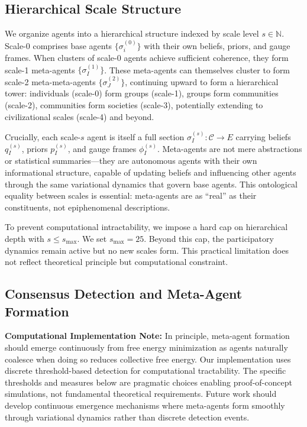 \documentclass[11pt]{article}
\begin{document}
\subsection{Hierarchical Scale Structure}

We organize agents into a hierarchical structure indexed by scale level $s \in \mathbb{N}$. Scale-0 comprises base agents $\{\sigma_i^{(0)}\}$ with their own beliefs, priors, and gauge frames. When clusters of scale-0 agents achieve sufficient coherence, they form scale-1 meta-agents $\{\sigma_I^{(1)}\}$. These meta-agents can themselves cluster to form scale-2 meta-meta-agents $\{\sigma_J^{(2)}\}$, continuing upward to form a hierarchical tower: individuals (scale-0) form groups (scale-1), groups form communities (scale-2), communities form societies (scale-3), potentially extending to civilizational scales (scale-4) and beyond.

Crucially, each scale-$s$ agent is itself a full section $\sigma_I^{(s)}: \mathcal{C} \to E$ carrying beliefs $q_I^{(s)}$, priors $p_I^{(s)}$, and gauge frames $\phi_I^{(s)}$. Meta-agents are not mere abstractions or statistical summaries---they are autonomous agents with their own informational structure, capable of updating beliefs and influencing other agents through the same variational dynamics that govern base agents. This ontological equality between scales is essential: meta-agents are as ``real'' as their constituents, not epiphenomenal descriptions.

To prevent computational intractability, we impose a hard cap on hierarchical depth with $s \leq s_{\max}$. We set $s_{\max} = 25$. Beyond this cap, the participatory dynamics remain active but no new scales form. This practical limitation does not reflect theoretical principle but computational constraint.

\subsection{Consensus Detection and Meta-Agent Formation}

\textbf{Computational Implementation Note:} In principle, meta-agent formation should emerge continuously from free energy minimization as agents naturally coalesce when doing so reduces collective free energy. Our implementation uses discrete threshold-based detection for computational tractability. The specific thresholds and measures below are pragmatic choices enabling proof-of-concept simulations, not fundamental theoretical requirements. Future work should develop continuous emergence mechanisms where meta-agents form smoothly through variational dynamics rather than discrete detection events.
\end{document}
